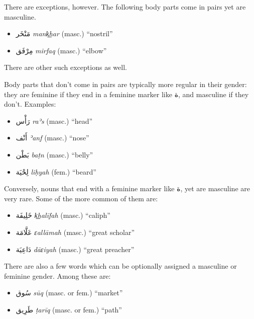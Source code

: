\documentclass[
  10pt,
]{book}
\providecommand{\tightlist}{%
  \setlength{\itemsep}{0pt}\setlength{\parskip}{0pt}}
\begin{document}
There are exceptions, however. The following body parts come in pairs yet are masculine.

\begin{itemize}
\tightlist
\item
  \foreignlanguage{arabic}{مَنْخَر} \emph{mank͟har} (masc.) \enquote{nostril}
\item
  \foreignlanguage{arabic}{مِرْفَق} \emph{mirfaq} (masc.) \enquote{elbow}
\end{itemize}

There are other such exceptions as well.

Body parts that don't come in pairs are typically more regular in their gender: they are feminine if they end in a feminine marker like \foreignlanguage{arabic}{ة}, and masculine if they don't. Examples:

\begin{itemize}
\tightlist
\item
  \foreignlanguage{arabic}{رَأْس} \emph{raʾs} (masc.) \enquote{head}
\item
  \foreignlanguage{arabic}{أَنْف} \emph{ʾanf} (masc.) \enquote{nose}
\item
  \foreignlanguage{arabic}{بَطْن} \emph{baṭn} (masc.) \enquote{belly}
\item
  \foreignlanguage{arabic}{لِحْيَة} \emph{liḥyah} (fem.) \enquote{beard}
\end{itemize}

Conversely, nouns that end with a feminine marker like \foreignlanguage{arabic}{ة}, yet are masculine are very rare. Some of the more common of them are:

\begin{itemize}
\tightlist
\item
  \foreignlanguage{arabic}{خَلِيفَة} \emph{k͟halīfah} (masc.) \enquote{caliph}
\item
  \foreignlanguage{arabic}{عَلَّامَة} \emph{ɛallāmah} (masc.) \enquote{great scholar}
\item
  \foreignlanguage{arabic}{دَاعِيَة} \emph{dāɛiyah} (masc.) \enquote{great preacher}
\end{itemize}

There are also a few words which can be optionally assigned a masculine or feminine gender. Among these are:

\begin{itemize}
\tightlist
\item
  \foreignlanguage{arabic}{سُوق} \emph{sūq} (masc. or fem.) \enquote{market}
\item
  \foreignlanguage{arabic}{طَرِيق} \emph{ṭarīq} (masc. or fem.) \enquote{path}
\end{itemize}
\end{document}
